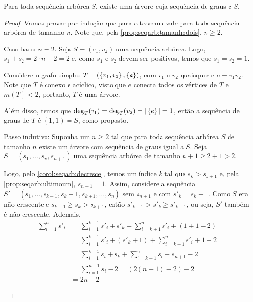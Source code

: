 \begin{lemma} \label{lemma:seqarb:existearvore}
    Para toda sequência arbórea $S$, existe uma árvore cuja sequência de graus é $S$.
\end{lemma}

\enlargethispage{1em}
\begin{proof}
    Vamos provar por indução que para o teorema vale para toda sequência arbórea de tamanho $n$. Note que, pela \cref{prop:seqarb:tamanhodois}, $n \geq 2$.

    \begin{ncasos}
        \item[Caso base:] $n = 2$. Seja $S = (s_1, s_2)$ uma sequência arbórea. Logo, $s_1 + s_2 = 2 \cdot n - 2 = 2$ e, como $s_1$ e $s_2$ devem ser positivos, temos que $s_1 = s_2 = 1$.

        Considere o grafo simples $T = (\set{v_1, v_2}, \set{e})$, com $v_1$ e $v_2$ quaisquer e $e = v_1 v_2$. Note que $T$ é conexo e acíclico, visto que $e$ conecta todos os vértices de $T$ e $m(T) < 2$, portanto, $T$ é uma árvore.

        Além disso, temos que $\grau_T(v_1) = \grau_T(v_2) = \abs{\set{e}} = 1$, então a sequência de graus de $T$ é $(1, 1) = S$, como proposto.

        \item[Passo indutivo:] Suponha um $n \geq 2$ tal que para toda  sequência arbórea $S$ de tamanho $n$ existe um árvore com sequência de graus igual a $S$. Seja $S = (s_1, \ldots, s_n, s_{n+1})$ uma sequência arbórea de tamanho $n + 1 \geq 2 + 1 > 2$.

        Logo, pelo \cref{corol:seqarb:decresce}, temos um índice $k$ tal que $s_k > s_{k + 1}$ e, pela \cref{prop:seqarb:ultimoum}, $s_{n + 1} = 1$. Assim, considere a sequência $S' = (s_1, \ldots, s_{k - 1}, s_k - 1, s_{k + 1}, \ldots, s_n)$ sem $s_{n + 1}$ e com $s'_k = s_k - 1$. Como $S$ era não-crescente e $s_{k - 1} \geq s_k > s_{k + 1}$, então $s'_{k - 1} > s'_k \geq s'_{k + 1}$, ou seja, $S'$ também é não-crescente. Ademais,
        \begin{align*}
            \sum_{i = 1}^n s'_i &= \sum_{i = 1}^{k - 1} s'_i + s'_k + \sum_{i = k + 1}^n s'_i + (1 + 1 - 2) \\
            &= \sum_{i = 1}^{k - 1} s'_i + \left(s'_k + 1\right) + \sum_{i = k + 1}^n s'_i + 1 - 2 \\
            &= \sum_{i = 1}^{k - 1} s_i + s_k + \sum_{i = k + 1}^n s_i + s_{n + 1} - 2 \\
            &= \sum_{i = 1}^{n + 1} s_i - 2
            = (2 (n + 1) - 2) - 2 \\
            &= 2 n - 2
        \end{align*}


\end{ncasos}
\end{proof}

